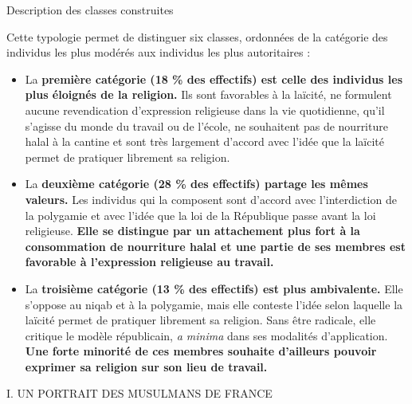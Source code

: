 Description des classes construites


Cette typologie permet de distinguer six classes, ordonnées de la
catégorie des individus les plus modérés aux individus les plus
autoritaires :


\begin{itemize}
\item
  La \textbf{première catégorie (18 \% des effectifs) est celle des
  individus les plus éloignés de la religion.} Ils sont favorables à la
  laïcité, ne formulent aucune revendication d'expression religieuse
  dans la vie quotidienne, qu'il s'agisse du monde du travail ou de
  l'école, ne souhaitent pas de nourriture halal à la cantine et sont
  très largement d'accord avec l'idée que la laïcité permet de pratiquer
  librement sa religion.
\item
  La \textbf{deuxième catégorie (28 \% des effectifs) partage les mêmes
  valeurs.} Les individus qui la composent sont d'accord avec
  l'interdiction de la polygamie et avec l'idée que la loi de la
  République passe avant la loi religieuse. \textbf{Elle se distingue
  par un attachement plus fort à la consommation de nourriture halal et
  une partie de ses membres est favorable à l'expression religieuse au
  travail.}
\item
  La \textbf{troisième catégorie (13 \% des effectifs) est plus
  ambivalente.} Elle s'oppose au niqab et à la polygamie, mais elle
  conteste l'idée selon laquelle la laïcité permet de pratiquer
  librement sa religion. Sans être radicale, elle critique le modèle
  républicain, \emph{a minima} dans ses modalités d'application.
  \textbf{Une forte minorité de ces membres souhaite d'ailleurs pouvoir
  exprimer sa religion sur son lieu de travail.}
\end{itemize}


I. UN PORTRAIT DES MUSULMANS DE FRANCE


